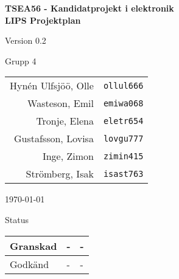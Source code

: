 \documentclass[11pt]{article}
\begin{document}
\begin{titlepage}
\begin{center}

{\Large\bfseries TSEA56 - Kandidatprojekt i elektronik \\ LIPS Projektplan}

\vspace{5em}

Version 0.2

\vspace{5em}
Grupp 4 \\
\begin{tabular}{rl}
Hynén Ulfsjöö, Olle&\verb+ollul666+
\\
Wasteson, Emil&\verb+emiwa068+
\\
Tronje, Elena&\verb+eletr654+
\\
Gustafsson, Lovisa&\verb+lovgu777+
\\
Inge, Zimon&\verb+zimin415+
\\
Strömberg, Isak&\verb+isast763+
\\
\end{tabular}

\vspace{5em}
\today

\vspace{16em}
Status
\begin{longtable}{|l|l|l|} \hline

Granskad & - & - \\ \hline
Godkänd & - & - \\ \hline
 
\end{longtable}

\end{center}
\end{titlepage}
\end{document}
